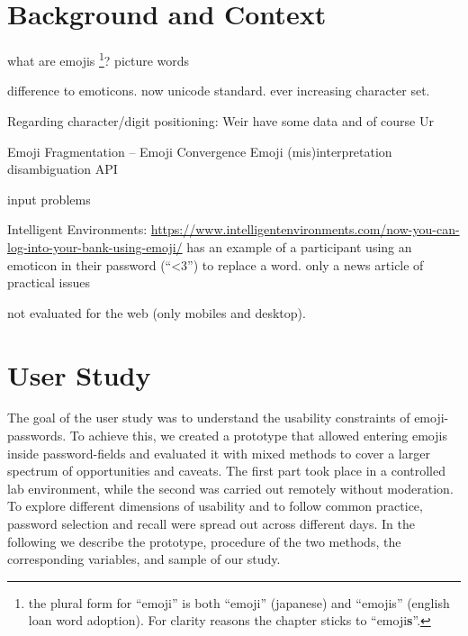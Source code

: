 \section{Background and Context}
what are emojis \footnote{the plural form for ``emoji'' is both ``emoji'' (japanese) and ``emojis'' (english loan word adoption). For clarity reasons the chapter sticks to ``emoji\textbf{s}''.}?  picture words \cite{Taggart2015NewWords}

difference to emoticons. now unicode standard. ever increasing character set. 

Regarding character/digit positioning: Weir \etal have some data \cite{Weir2010MetricsPolicies} and of course Ur \etal \cite{Ur2015PWCreationLab}

Emoji Fragmentation -- Emoji Convergence 
Emoji (mis)interpretation 
\cite{Tigwell2016EmojiMisunderstandings}
\cite{Miller2015BlissfullyHappyEmoji}
\cite{Wijeratne2010} disambiguation API

\cite{Pohl2017BeyondTextEmoji} input problems

\cite{Golla2017EmojiAuth, Kraus2017Emoji}
Intelligent Environments: \url{https://www.intelligentenvironments.com/now-you-can-log-into-your-bank-using-emoji/}
\cite{Kuo2006HumanSelectionMnemonic} has an example of a participant using an emoticon in their password (``<3'') to replace a word. 
\cite{Dashinsky2015NoEmojisInPWs} only a news article of practical issues
\cite{Malih2015ThesisEmojiPWs}

not evaluated for the web (only mobiles and desktop).


\section{User Study}
The goal of the user study was to understand the usability constraints of emoji-passwords. To achieve this, we created a prototype that allowed entering emojis inside password-fields and evaluated it with mixed methods to cover a larger spectrum of opportunities and caveats. The first part took place in a controlled lab environment, while the second was carried out remotely without moderation. To explore different dimensions of usability and to follow common practice, password selection and recall were spread out across different days. In the following we describe the prototype, procedure of the two methods, the corresponding variables, and sample of our study. 

